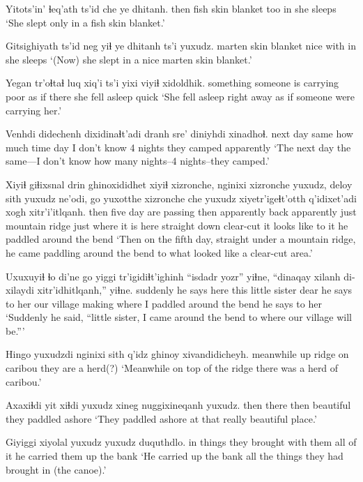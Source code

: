 \documentclass[12pt]{article}
\begin{document}
\gll Yitots'in' ɬeq'ath   ts'id   che ye dhitanh.
then       {fish skin} blanket too in {she sleeps}
\glt `She slept only in a fish skin blanket.'
\glend

\gll Gitsighiyath ts'id neg yiɬ ye dhitanh ts'i yuxudz.
{marten skin}  blanket nice with in {she sleeps }
\glt `(Now) she slept in a nice marten skin blanket.'
\glend

\gll Yegan   tr'oɬtaɬ            luq  xiq'i ts'i yixi  {viyiɬ xidoldhik}.
something     {someone is carrying} poor {as if} {}  there {she fell asleep quick}
\glt `She fell asleep right away as if someone were carrying her.'
\glend

\gll Venhdi   didechenh dixidinaɬt'adi dranh sre'          diniyhdi xinadhoɬ.
{next day} same    {how much time}  day {I don't know}  {4 nights} {they camped } apparently
\glt `The next day the same---I don't know how many nights--4 nights--they camped.'
\glend

\gll Xiyiɬ giɬixsnal drin ghinoxididhet xiyiɬ xizronche, nginixi xizronche yuxudz, deloy    sith yuxudz ne'odi,  go yuxotthe     xizronche che yuxudz xiyetr'igeɬt'otth q'idixet'adi  xogh  xitr'i'itlqanh.
then  five      day {are passing}   then apparently back apparently just mountain ridge  just   {where it is} here   {straight down} {} {} {} clear-cut         {it looks like} {to it} {he paddled around the bend}
\glt `Then on the fifth day, straight under a mountain ridge, he came paddling around the bend to what looked like a clear-cut area.'
\glend

\gll Uxuxuyiɬ ɬo di'ne   go   yiggi tr'igidiɬt'ighinh ``isdadr        yozr'' yiɬne,  ``dinaqay {xilanh di-} xilaydi    xitr'idhitlqanh,''           yiɬne.
suddenly  {}  {he says} here this {} {little sister} dear {he says to her} {our village}    {}   {making where} {I paddled around the bend} {he says to her}
\glt `Suddenly he said, ``little sister, I came around the bend to where our village will be.'''
\glend

\gll Hingo     yuxudzdi nginixi sith  q'idz ghinoy  xivandidicheyh.
meanwhile  {}       up      ridge on    caribou {they are a herd(?)}
\glt `Meanwhile on top of the ridge there was a herd of caribou.'
\glend

\gll Axaxiɬdi yit   xiɬdi yuxudz xineg     nuggixineqanh yuxudz. 
then     there then {}      beautiful {they paddled ashore}
\glt `They paddled ashore at that really beautiful place.'
\glend

\gll Giyiggi xiyolal                       {yuxudz yuxudz} duquthdlo.
in      {things they brought with them} {all of it}   {he carried them up the bank}
\glt `He carried up the bank all the things they had brought in (the canoe).'
\glend
\end{document}
